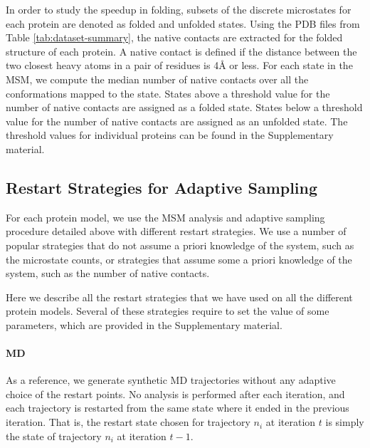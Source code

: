 In order to study the speedup in folding, subsets of the discrete microstates for
each protein are denoted as folded and unfolded states. 
Using the PDB files from Table \ref{tab:dataset-summary}, the native contacts
are extracted for the folded structure of each protein. A native contact is
defined if the distance between the two closest heavy atoms in a pair of
residues is 4\r{A} or less. For each state in the MSM, we compute the median number of native
contacts over all the conformations mapped to the state. States above a threshold
value for the number of native contacts are assigned as a folded state. States
below a threshold value for the number of native contacts are assigned as an
unfolded state. The threshold values for individual proteins can be found in the Supplementary material. 

\subsection{\label{sec:restart-strategies}Restart Strategies for Adaptive Sampling}

For each protein model, we use the MSM analysis and adaptive sampling procedure detailed
above with different restart strategies. We use a number of popular
strategies that do not assume a priori knowledge of the system, such as the microstate counts, or strategies that assume some a
priori knowledge of the system, such as the number of native contacts. 


Here we describe all the restart strategies that we have used on all the
different protein models. Several of these strategies require to set the value
of some parameters, which are provided in the Supplementary material. 

\paragraph{MD} 
As a reference, we generate synthetic MD trajectories without any adaptive
choice of the restart points. No analysis is performed after each
iteration, and each trajectory is restarted from the same state where it
ended in the previous iteration. That is, the restart state chosen for
trajectory $n_i$ at iteration $t$ is simply the state of trajectory $n_i$ at
iteration $t-1$.

